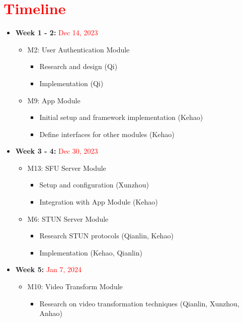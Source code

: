 \documentclass[12pt, titlepage]{article}
\newcommand{\rt}[1]{\textcolor{red}{#1}}
\begin{document}
\section{\rt{Timeline}}

\begin{itemize}
  \item \textbf{Week 1 - 2:} \rt{Dec 14, 2023}
  \begin{itemize}
      \item M2: User Authentication Module
      \begin{itemize}
          \item Research and design (Qi)
          \item Implementation (Qi)
      \end{itemize}
      \item M9: App Module
      \begin{itemize}
          \item Initial setup and framework implementation (Kehao)
          \item Define interfaces for other modules (Kehao)
      \end{itemize}
  \end{itemize}
  \item \textbf{Week 3 - 4:} \rt{Dec 30, 2023}
  \begin{itemize}
      \item M13: SFU Server Module
      \begin{itemize}
          \item Setup and configuration (Xunzhou)
          \item Integration with App Module (Kehao)
      \end{itemize}
      \item M6: STUN Server Module
      \begin{itemize}
          \item Research STUN protocols (Qianlin, Kehao)
          \item Implementation (Kehao, Qianlin)
      \end{itemize}
  \end{itemize}
  \item \textbf{Week 5:} \rt{Jan 7, 2024}
  \begin{itemize}
      \item M10: Video Transform Module
      \begin{itemize}
          \item Research on video transformation techniques (Qianlin, Xunzhou, Anhao)

\end{itemize}
\end{itemize}
\end{itemize}
\end{document}
